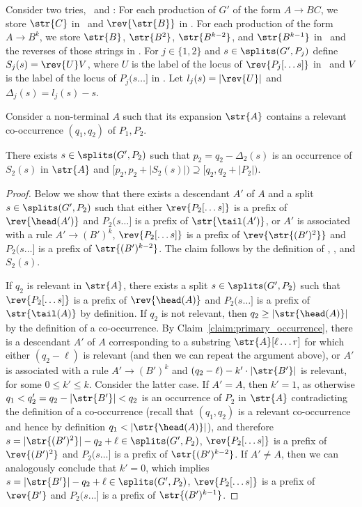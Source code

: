 Consider two tries, \Tpre\ and \Tsuf: For each production of $G'$ of the form $A\rightarrow BC$, we store $\str{C}$ in  \Tsuf\ and $\rev{\str{B}}$ in \Tpre. For each production of the form $A\rightarrow B^k$, we store $\str{B}$, $\str{B^2}$, $\str{B^{k-2}}$, and $\str{B^{k-1}}$ in \Tsuf\ and the reverses of those strings in \Tpre. For $j \in \{1,2\}$ and $s \in \splits(G', P_j)$ define $S_j(s) = \rev{U} V$, where $U$ is the label of the locus of $\rev{P_j[\dots s]}$ in \Tpre\ and $V$ is the label of the locus of $P_j(s \dots]$ in \Tsuf. Let $l_j(s) = |\rev{U}|$ and $\Delta_j(s) = l_j(s)-s$.  

Consider a non-terminal $A$ such that its expansion $\str{A}$ contains a relevant co-occurrence $(q_1,q_2)$ of $P_1,P_2$. 

\begin{claim}\label{claim:q2}
There exists $s \in \splits(G', P_2)$ such that $p_2 = q_2-\Delta_2(s)$ is an occurrence of $S_2(s)$ in $\str{A}$ and $[p_2,p_2+|S_2(s)|) \supseteq [q_2,q_2+|P_2|)$.
\end{claim}
\begin{proof}
Below we show that there exists a descendant $A'$ of $A$ and a split $s \in \splits(G', P_2)$ such that either $\rev{P_2[\dots s]}$ is a prefix of $\rev{\head(A')}$ and $P_2(s \dots ]$ is a prefix of $\str{\tail(A')}$, or $A'$ is associated with a rule $A' \rightarrow (B')^k$, $\rev{P_2[\dots s]}$ is a prefix of $\rev{\str{(B')^2}}$ and $P_2(s\dots ]$ is a prefix of $\str{(B')^{k-2}}$. The claim follows by the definition of \Tpre, \Tsuf, and $S_2(s)$. 

If $q_2$ is relevant in $\str{A}$, there exists a split $s \in \splits(G', P_2)$ such that $\rev{P_2[\dots s]}$ is a prefix of $\rev{\head(A)}$ and $P_2(s \dots ]$ is a prefix of $\str{\tail(A)}$ by definition. If $q_2$ is not relevant, then $q_2 \ge |\str{\head(A)}|$ by the definition of a co-occurrence. By Claim~\ref{claim:primary_occurrence}, there is a descendant $A'$ of $A$ corresponding to a substring $\str{A}[\ell \dots r]$ for which either $(q_2-\ell)$ is relevant (and then we can repeat the argument above), or $A'$ is associated with a rule $A' \rightarrow (B')^k$ and $(q_2-\ell)-k' \cdot |\str{B'}|$ is relevant, for some $0 \le k' \le k$. Consider the latter case. If $A'=A$, then $k'=1$, as otherwise $q_1 < q_2' = q_2-|\str{B'}| < q_2$ is an occurrence of $P_2$ in $\str{A}$ contradicting the definition of a co-occurrence (recall that $(q_1,q_2)$ is a relevant co-occurrence and hence by definition $q_1 < |\str{\head(A)}|$), and therefore $s = |\str{(B')^2}|-q_2+\ell \in \splits(G', P_2)$, $\rev{P_2[ \dots s]}$ is a prefix of $\rev{(B')^2}$ and $P_2(s \dots ]$ is a prefix of $\str{(B')^{k-2}}$. If $A' \neq A$, then we can analogously conclude that $k'=0$, which implies $s = |\str{B'}|-q_2+\ell \in \splits(G', P_2)$, $\rev{P_2[ \dots s]}$ is a prefix of $\rev{B'}$ and $P_2(s \dots ]$ is a prefix of $\str{(B')^{k-1}}$.
\end{proof}


